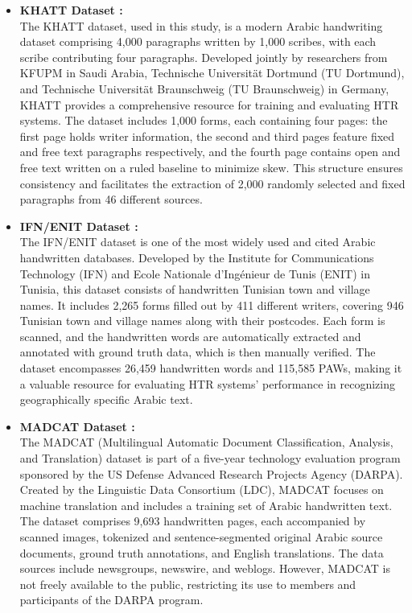 \documentclass[conference]{IEEEtran}
\begin{document}
\begin{itemize}
  \item \textbf{KHATT Dataset \cite{mahmoud2012khatt, mahmoud2014khatt}:} \\
  The KHATT dataset, used in this study, is a modern Arabic handwriting dataset comprising 4,000 paragraphs written by 1,000 scribes, with each scribe contributing four paragraphs. Developed jointly by researchers from KFUPM in Saudi Arabia, Technische Universität Dortmund (TU Dortmund), and Technische Universität Braunschweig (TU Braunschweig) in Germany, KHATT provides a comprehensive resource for training and evaluating HTR systems. The dataset includes 1,000 forms, each containing four pages: the first page holds writer information, the second and third pages feature fixed and free text paragraphs respectively, and the fourth page contains open and free text written on a ruled baseline to minimize skew. This structure ensures consistency and facilitates the extraction of 2,000 randomly selected and fixed paragraphs from 46 different sources.

  \item \textbf{IFN/ENIT Dataset \cite{pechwitz2002ifn}:} \\
  The IFN/ENIT dataset is one of the most widely used and cited Arabic handwritten databases. Developed by the Institute for Communications Technology (IFN) and Ecole Nationale d’Ingénieur de Tunis (ENIT) in Tunisia, this dataset consists of handwritten Tunisian town and village names. It includes 2,265 forms filled out by 411 different writers, covering 946 Tunisian town and village names along with their postcodes. Each form is scanned, and the handwritten words are automatically extracted and annotated with ground truth data, which is then manually verified. The dataset encompasses 26,459 handwritten words and 115,585 PAWs, making it a valuable resource for evaluating HTR systems' performance in recognizing geographically specific Arabic text.

  \item \textbf{MADCAT Dataset \cite{lee2012madcat}:} \\
  The MADCAT (Multilingual Automatic Document Classification, Analysis, and Translation) dataset is part of a five-year technology evaluation program sponsored by the US Defense Advanced Research Projects Agency (DARPA). Created by the Linguistic Data Consortium (LDC), MADCAT focuses on machine translation and includes a training set of Arabic handwritten text. The dataset comprises 9,693 handwritten pages, each accompanied by scanned images, tokenized and sentence-segmented original Arabic source documents, ground truth annotations, and English translations. The data sources include newsgroups, newswire, and weblogs. However, MADCAT is not freely available to the public, restricting its use to members and participants of the DARPA program.


\end{itemize}
\end{document}
